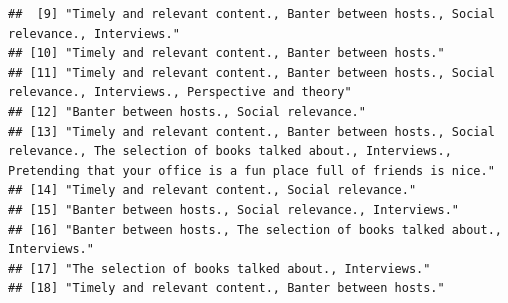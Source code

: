 \documentclass[]{article}
\begin{document}
\begin{verbatim}
##  [9] "Timely and relevant content., Banter between hosts., Social relevance., Interviews."                                                                                                                                                                                      
## [10] "Timely and relevant content., Banter between hosts."                                                                                                                                                                                                                      
## [11] "Timely and relevant content., Banter between hosts., Social relevance., Interviews., Perspective and theory"                                                                                                                                                              
## [12] "Banter between hosts., Social relevance."                                                                                                                                                                                                                                 
## [13] "Timely and relevant content., Banter between hosts., Social relevance., The selection of books talked about., Interviews., Pretending that your office is a fun place full of friends is nice."                                                                           
## [14] "Timely and relevant content., Social relevance."                                                                                                                                                                                                                          
## [15] "Banter between hosts., Social relevance., Interviews."                                                                                                                                                                                                                    
## [16] "Banter between hosts., The selection of books talked about., Interviews."                                                                                                                                                                                                 
## [17] "The selection of books talked about., Interviews."                                                                                                                                                                                                                        
## [18] "Timely and relevant content., Banter between hosts."                                                                                                                                                                                                                      

\end{verbatim}
\end{document}
